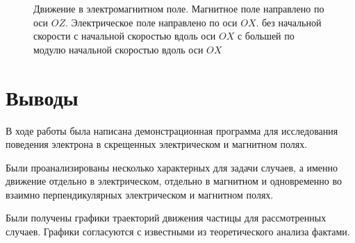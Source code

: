 \documentclass[12pt,a4paper]{article}
\begin{document}
\begin{figure}[h]%
\centering
%
%
\hspace{8pt}%
%
%
\hspace{8pt}%
%
%
\hspace{8pt}%
%
\caption[Движение в электромагнитном поле]{Движение в электромагнитном поле. Магнитное поле направлено по оси $OZ$. Электрическое поле направлено по оси $OX$.
 без начальной скорости %
 с начальной скоростью вдоль оси $OX$ %
 с большей по модулю начальной скоростью вдоль оси $OX$} %
\label{fig:electromagnetic}%
\end{figure}

\section{Выводы}

В ходе работы была написана демонстрационная программа для исследования поведения электрона в скрещенных электрическом и магнитном полях.

Были проанализированы несколько характерных для задачи случаев, а именно движение отдельно в электрическом, отдельно в магнитном и одновременно во взаимно перпендикулярных электрическом и магнитном полях.

Были получены графики траекторий движения частицы для рассмотренных случаев. Графики согласуются с известными из теоретического анализа фактами.
\end{document}
